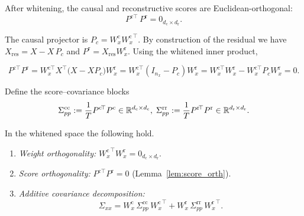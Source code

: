 \documentclass[14pt]{extarticle}
\begin{document}
	\begin{lemma}\label{lem:score_orth}
		After whitening, the causal and reconstructive scores are Euclidean-orthogonal:
		\[
		P^{\mathrm c\!\top}\,P^{\mathrm r}=0_{d_{\mathrm c}\times d_{\mathrm r}}.
		\]
	\end{lemma}
	
	\begin{Proof}
		The causal projector is \(P_c=W_x^{\mathrm c}{W_x^{\mathrm c}}^{\!\top}\).
		By construction of the residual we have  
		\(X_{\mathrm{res}} = X - X\,P_c\) and
		\(P^{\mathrm r}=X_{\mathrm{res}}W_x^{\mathrm r}\).
		Using the whitened inner product,
		
		\[
		\!P^{\mathrm c\!\top}P^{\mathrm r}
		= W_x^{\mathrm c\!\top}X^{\top}\bigl(X-XP_c\bigr)W_x^{\mathrm r}
		= W_x^{\mathrm c\!\top}(I_{n_x}-P_c)W_x^{\mathrm r}
		= W_x^{\mathrm c\!\top}W_x^{\mathrm r}-W_x^{\mathrm c\!\top}P_cW_x^{\mathrm r}
		= 0.
		\]
	\end{Proof}
	
	Define the score–covariance blocks
	\[
	\Sigma_{pp}^{\mathrm{cc}}
	:=\frac1T P^{\mathrm c\!\top}P^{\mathrm c}\in\mathbb{R}^{d_{\mathrm c}\times d_{\mathrm c}},\;
	\Sigma_{pp}^{\mathrm{rr}}
	:=\frac1T P^{\mathrm r\!\top}P^{\mathrm r}\in\mathbb{R}^{d_{\mathrm r}\times d_{\mathrm r}}.
	\]
	
	\begin{theorem}
		\label{thm:orth_blocks}
		In the whitened space the following hold.
		\begin{enumerate}[label=(\roman*)]
			\item \emph{Weight orthogonality:}
			\({W_x^{\mathrm c}}^{\!\top}W_x^{\mathrm r}=0_{d_{\mathrm c}\times d_{\mathrm r}}\).
			\item \emph{Score orthogonality:}
			\(P^{\mathrm c\!\top}P^{\mathrm r}=0\)  (Lemma~\ref{lem:score_orth}).
			\item \emph{Additive covariance decomposition:}
			\[
			\Sigma_{xx}=W_x^{\mathrm c}\,\Sigma_{pp}^{\mathrm{cc}}\,{W_x^{\mathrm c}}^{\!\top}
			+W_x^{\mathrm r}\,\Sigma_{pp}^{\mathrm{rr}}\,{W_x^{\mathrm r}}^{\!\top}.
			\]
		\end{enumerate}
	\end{theorem}
	
\end{document}
